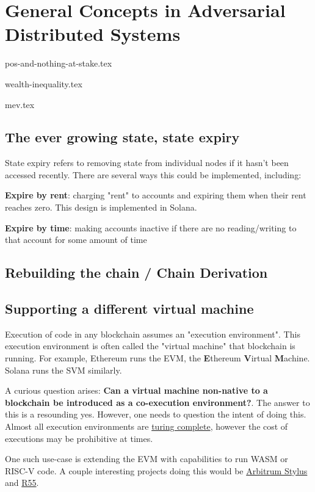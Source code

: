 \chapter{General Concepts in Adversarial Distributed Systems}


{pos-and-nothing-at-stake.tex}

{wealth-inequality.tex}

{mev.tex}

\section{The ever growing state, state expiry}
State expiry refers to removing state from individual nodes if it hasn't been accessed recently. There are several ways this could be implemented, including:

\textbf{Expire by rent}: charging "rent" to accounts and expiring them when their rent reaches zero. This design is implemented in Solana.

\textbf{Expire by time}: making accounts inactive if there are no reading/writing to that account for some amount of time


\section{Rebuilding the chain / Chain Derivation}

\section{Supporting a different virtual machine}
Execution of code in any blockchain assumes an "execution environment". This execution environment is often called the "virtual machine" that blockchain is running. For example, Ethereum runs the EVM, the \textbf{E}thereum \textbf{V}irtual \textbf{M}achine. Solana runs the SVM similarly.

A curious question arises: \textbf{Can a virtual machine non-native to a blockchain be introduced as a co-execution environment?}. The answer to this is a resounding yes. However, one needs to question the intent of doing this. Almost all execution environments are \href{https://www.bitstamp.net/learn/blockchain/what-is-turing-complete/}{turing complete}, however the cost of executions may be prohibitive at times.

One such use-case is extending the EVM with capabilities to run WASM or RISC-V code. A couple interesting projects doing this would be \href{https://arbitrum.io/stylus}{Arbitrum Stylus} and \href{https://hackmd.io/@leoalt/r55}{R55}.


